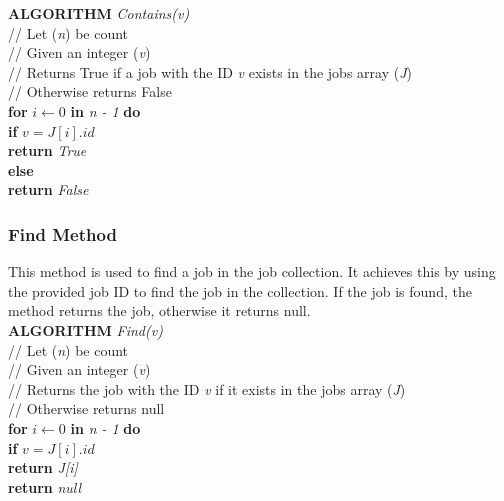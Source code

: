 \documentclass[12pt,a4paper]{article}
\begin{document}
				\textbf{ALGORITHM} \textit{Contains(v)}\\
				\null\hspace{1cm}// Let (\textit{n}) be count\\
				\null\hspace{1cm}// Given an integer (\textit{v})\\
				\null\hspace{1cm}// Returns True if a job with the ID \textit{v} exists in the jobs array (\textit{J})\\
				\null\hspace{1cm}// Otherwise returns False\\
				\null\hspace{1cm}\textbf{for} \textit{$i \gets 0$} \textbf{in} \textit{n - 1} \textbf{do}\\
				\null\hspace{2cm}\textbf{if} \textit{$v = J[i].id$}\\
				\null\hspace{3cm}\textbf{return} \textit{True}\\
				\null\hspace{1cm}\textbf{else}\\
				\null\hspace{2cm}\textbf{return} \textit{False}
			
			\newpage

			\subsubsection{Find Method}
				This method is used to find a job in the job collection. It achieves this by using the provided 
				job ID to find the job in the collection. If the job is found, the method returns the job, 
				otherwise it returns null.\\

				\textbf{ALGORITHM} \textit{Find(v)}\\
				\null\hspace{1cm}// Let (\textit{n}) be count\\
				\null\hspace{1cm}// Given an integer (\textit{v})\\
				\null\hspace{1cm}// Returns the job with the ID \textit{v} if it exists in the jobs array (\textit{J})\\
				\null\hspace{1cm}// Otherwise returns null\\
				\null\hspace{1cm}\textbf{for} \textit{$i \gets 0$} \textbf{in} \textit{n - 1} \textbf{do}\\
				\null\hspace{2cm}\textbf{if} \textit{$v = J[i].id$}\\
				\null\hspace{3cm}\textbf{return} \textit{J[i]}\\
				\null\hspace{1cm}\textbf{return} \textit{null}\\
\end{document}
